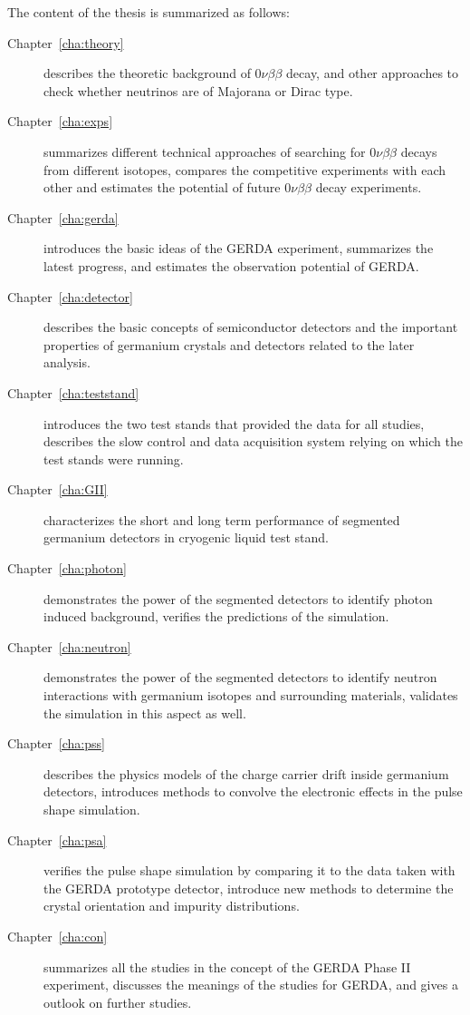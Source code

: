 The content of the thesis is summarized as follows:
\begin{description}
\item[Chapter~\ref{cha:theory}] describes the theoretic background of $0\nu\beta\beta$ decay, and other approaches to check whether neutrinos are of Majorana or Dirac type.
\item[Chapter~\ref{cha:exps}] summarizes different technical approaches of searching for $0\nu\beta\beta$ decays from different isotopes, compares the competitive experiments with each other and estimates the potential of future $0\nu\beta\beta$ decay experiments.
\item[Chapter~\ref{cha:gerda}] introduces the basic ideas of the GERDA experiment, summarizes the latest progress, and estimates the observation potential of GERDA.
\item[Chapter~\ref{cha:detector}] describes the basic concepts of semiconductor detectors and the important properties of germanium crystals and detectors related to the later analysis.
\item[Chapter~\ref{cha:teststand}] introduces the two test stands that provided the data for all studies, describes the slow control and data acquisition system relying on which the test stands were running.
\item[Chapter~\ref{cha:GII}] characterizes the short and long term performance of segmented germanium detectors in cryogenic liquid test stand.
\item[Chapter~\ref{cha:photon}] demonstrates the power of the segmented detectors to identify photon induced background, verifies the predictions of the simulation.
\item[Chapter~\ref{cha:neutron}] demonstrates the power of the segmented detectors to identify neutron interactions with germanium isotopes and surrounding materials, validates the simulation in this aspect as well.
\item[Chapter~\ref{cha:pss}] describes the physics models of the charge carrier drift inside germanium detectors, introduces methods to convolve the electronic effects in the pulse shape simulation. 
\item[Chapter~\ref{cha:psa}] verifies the pulse shape simulation by comparing it to the data taken with the GERDA prototype detector, introduce new methods to determine the crystal orientation and impurity distributions.
\item[Chapter~\ref{cha:con}] summarizes all the studies in the concept of the GERDA Phase II experiment, discusses the meanings of the studies for GERDA, and gives a outlook on further studies.
\end{description}

